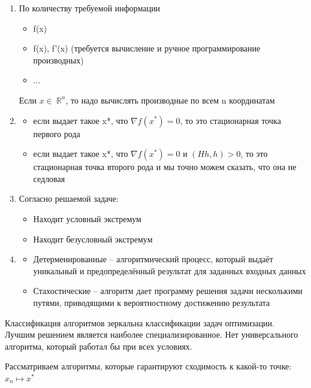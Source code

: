 \documentclass[a4paper, 12pt]{article}
\begin{document}
	
	
	\begin{enumerate}
		\item По количеству требуемой информации
		\begin{itemize}
			\item f(x) 
			\item f(x), f'(x) (требуется вычисление и ручное программирование производных)
			\item ...	
		\end{itemize}
		Если $x \in\ \mathbb {R}^n$, то надо вычислять производные по всем n координатам
		\item \begin{itemize}
			
			\item  если выдает такое x*, что  $\nabla f(x^*) = 0$, то это стационарная точка первого рода    
			\item если выдает такое x*, что  $\nabla f(x^*) = 0$ и $(Hh, h) > 0$, то это стационарная точка второго рода и мы точно можем сказать, что она не седловая
			
		\end{itemize}
		\item Согласно решаемой задаче:
		\begin{itemize}
			\item Находит условный экстремум
			\item Находит безусловный экстремум
		\end{itemize}
		\item 
		\begin{itemize}
			\item Детерменированные  -- алгоритмический процесс, который выдаёт уникальный и предопределённый результат для заданных входных данных
			\item Стахостические -- алгоритм дает программу решения задачи несколькими путями, приводящими к вероятностному достижению результата
		\end{itemize}
	\end{enumerate}
	
	Классификация алгоритмов зеркальна классификации задач оптимизации.
	Лучшим решением является наиболее специализированное. Нет универсального алгоритма, который работал бы при всех условиях.
	
	Рассматриваем алгоритмы, которые гарантируют сходимость к какой-то точке: $x_n \mapsto x^*$
	
\end{document}
